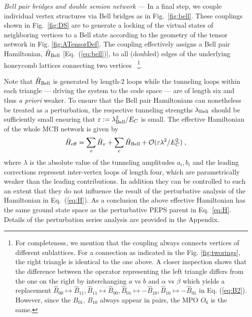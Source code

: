 \documentclass[twocolumn,floats,prx,showpacs]{revtex4-1}
\begin{document}
\emph{Bell pair bridges and double semion network ---}
In a final step, we couple individual vertex structures  via Bell bridges as in Fig.~\ref{fig:bell}. These couplings shown in Fig.~\ref{fig:DS} are to generate a locking of the virtual states of neighboring vertices to a Bell state according to the geometry of the tensor network in Fig. \ref{fig:ATensorDef}. The coupling effectively assigns a Bell pair Hamiltonian, $\hat H_{\rm Bell}$ [Eq.~(\ref{eq:bell})], to all (doubled) edges of the underlying honeycomb lattices connecting two vertices
~\footnote{For completeness, we mention that the coupling always connects vertices of different sublattices. For a connection as indicated in the Fig. \ref{fig:tworings}, the right triangle is identical to the one above. A closer inspection shows that the difference between the operator representing the left triangle differs from the one on the right by interchanging $a$ vs $b$ and $\alpha$ vs $\beta$ which yields a replacement $\hat B_{00}\mapsto \hat B_{11}, \hat B_{11}\mapsto \hat B_{00}, \hat B_{01}\mapsto -\hat B_{10},\hat B_{10}\mapsto - \hat B_{01}$ in Eq. (\ref{eq:B2}). However, since the $B_{01}$, $B_{10}$ always appear in pairs, the MPO $O_6$ is the same.}.



Note that $\hat H_{\rm Bell}$ is generated by length-2 loops while the  tunneling loops within each triangle --- driving the system to the code space --- 
are of length six and thus \emph{a priori} weaker. 
To ensure that the Bell pair Hamiltonians can nonetheless be treated as a perturbation, the respective tunneling strengths $\lambda_{\rm Bell}$ should be sufficiently small ensuring that $\varepsilon:=\lambda^2_{\rm Bell}/E_C$ is small. The effective Hamiltonian of the whole MCB network is given by
\begin{equation}
\hat H_{\rm eff}= \sum_v \hat H_v + \sum_e \hat H_{\rm Bell} + \mathcal O(\varepsilon\lambda^2/E_C^2) \;, \label{eq:DSeff}
\end{equation} 
where $\lambda$ is the absolute value of the tunneling amplitudes $a_i,b_i$ and the leading corrections represent inter-vertex loops of length four, which are parametrically weaker than the leading contributions. In addition they can be controlled to such an extent that they do not influence the result of the perturbative analysis \cite{Brell2014} of the Hamiltonian in Eq.~(\ref{eq:H}). As a conclusion the above effective Hamiltonian has the same ground state space as the perturbative PEPS parent in Eq.~\eqref{eq:H}. Details of the perturbation series analysis are provided in the Appendix.
\end{document}
